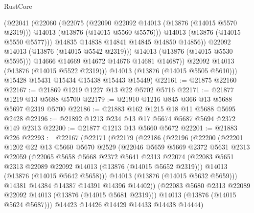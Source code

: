 \begin{lexlean}{RustCore}
\begin{coremodule}
                    (@22041
                      (@22060
                        (@22075
                          (@22090 @22092 @14013 (@13876 (@14015 @5570 @2319)))
                          @14013
                          (@13876 (@14015 @5560 @5576)))
                        @14013
                        (@13876 (@14015 @5550 @5577)))
                      @14835
                      @14838
                      @14841
                      @14845
                      @14850
                      @14856))
                  @22092
                  @14013
                  (@13876 (@14015 @5542 @2319)))
                @14013
                (@13876 (@14015 @5530 @5595)))
              @14666
              @14669
              @14672
              @14676
              @14681
              @14687))
          @22092
          @14013
          (@13876 (@14015 @5522 @2319)))
        @14013
        (@13876 (@14015 @5505 @5610)))
      @15428
      @15431
      @15434
      @15438
      @15443
      @15449)
@22161 := @21875 @22160
@22167 := @21869 @1219 @1227 @13 @22 @5702 @5716
@22171 := @21877 @1219 @13 @5688 @5700
@22179 := @21910 @1216 @845 @366 @13 @5688 @5697 @2319 @5700
@22186 := @21883 @162 @1215 @18 @11 @5688 @5695 @2428
@22196 := @21892 @1213 @234 @13 @17 @5674 @5687 @5694 @2372 @149 @2313
@22200 := @21877 @1213 @13 @5660 @5672
@22201 := @21883 @226
@22293 := @22167
    (@22171
      (@22179
        (@22186
          (@22196
            (@22200
              (@22201
                @1202
                @22
                @13
                @5660
                @5670
                @2529
                (@22046
                  @5659
                  @5669
                  @2372
                  @5631
                  @2313
                  @22059
                  (@22065
                    @5658
                    @5668
                    @2372
                    @5641
                    @2313
                    @22074
                    (@22083 @5651 @2313 @22089 @22092 @14013 (@13876 (@14015 @5652 @2319)))
                    @14013
                    (@13876 (@14015 @5642 @5658)))
                  @14013
                  (@13876 (@14015 @5632 @5659)))
                @14381
                @14384
                @14387
                @14391
                @14396
                @14402))
            (@22083 @5680 @2313 @22089 @22092 @14013 (@13876 (@14015 @5681 @2319)))
            @14013
            (@13876 (@14015 @5624 @5687)))
          @14423
          @14426
          @14429
          @14433
          @14438
          @14444)

\end{coremodule}
\end{lexlean}

